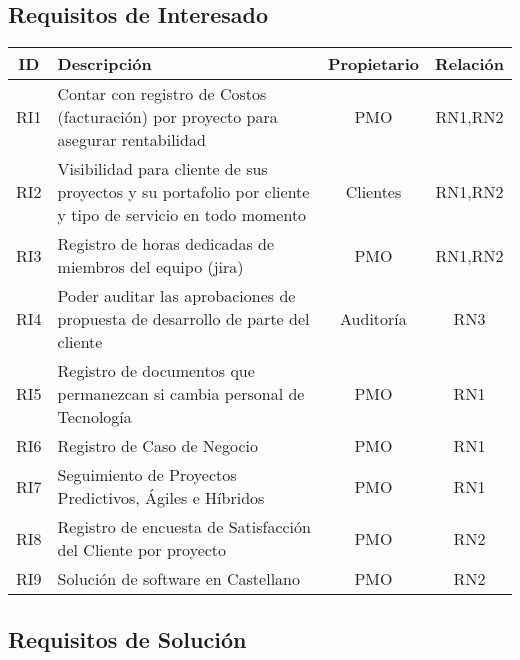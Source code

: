 \subsection*{Requisitos de Interesado}
\begin{tabular}{|c|p{7.5cm}|c|c|}
\hline
\textbf{ID} & \textbf{Descripción} & \textbf{Propietario} & \textbf{Relación} \\
\hline
RI1 & Contar con registro de Costos (facturación) por proyecto para asegurar rentabilidad & PMO & RN1,RN2 \\
\hline
RI2 & Visibilidad para cliente de sus proyectos y su portafolio por cliente y tipo de servicio en todo momento & Clientes & RN1,RN2 \\
\hline
RI3 & Registro de horas dedicadas de miembros del equipo (jira) & PMO & RN1,RN2 \\
\hline
RI4 & Poder auditar las aprobaciones de propuesta de desarrollo de parte del cliente & Auditoría & RN3 \\
\hline
RI5 & Registro de documentos que permanezcan si cambia personal de Tecnología & PMO & RN1 \\
\hline
RI6 & Registro de Caso de Negocio & PMO & RN1 \\
\hline
RI7 & Seguimiento de Proyectos Predictivos, Ágiles e Híbridos & PMO & RN1 \\
\hline
RI8 & Registro de encuesta de Satisfacción del Cliente por proyecto & PMO & RN2 \\
\hline
RI9 & Solución de software en Castellano & PMO & RN2 \\
\hline
\end{tabular}

\subsection*{Requisitos de Solución}

